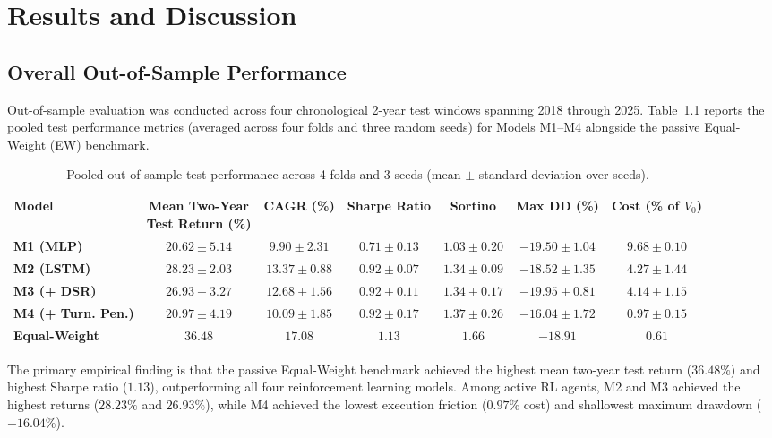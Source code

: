 \chapter{Results and Discussion}
\label{ch:results}

\section{Overall Out-of-Sample Performance}
Out-of-sample evaluation was conducted across four chronological 2-year test windows spanning 2018 through 2025. Table~\ref{tab:overall_results} reports the pooled test performance metrics (averaged across four folds and three random seeds) for Models M1--M4 alongside the passive Equal-Weight (EW) benchmark.

\begin{table}[htbp]
\centering
\small
\setlength{\tabcolsep}{5pt}
\caption{Pooled out-of-sample test performance across 4 folds and 3 seeds (mean $\pm$ standard deviation over seeds).}
\label{tab:overall_results}
\begin{tabular}{lcccccc}
\toprule
\textbf{Model} & \shortstack{\textbf{Mean Two-Year}\\\textbf{Test Return (\%)}} & \textbf{CAGR (\%)} & \textbf{Sharpe Ratio} & \textbf{Sortino} & \textbf{Max DD (\%)} & \textbf{Cost (\% of $V_0$)} \\
\midrule
\textbf{M1 (MLP)} & $20.62 \pm 5.14$ & $9.90 \pm 2.31$ & $0.71 \pm 0.13$ & $1.03 \pm 0.20$ & $-19.50 \pm 1.04$ & $9.68 \pm 0.10$ \\
\textbf{M2 (LSTM)} & $28.23 \pm 2.03$ & $13.37 \pm 0.88$ & $0.92 \pm 0.07$ & $1.34 \pm 0.09$ & $-18.52 \pm 1.35$ & $4.27 \pm 1.44$ \\
\textbf{M3 (+ DSR)} & $26.93 \pm 3.27$ & $12.68 \pm 1.56$ & $0.92 \pm 0.11$ & $1.34 \pm 0.17$ & $-19.95 \pm 0.81$ & $4.14 \pm 1.15$ \\
\textbf{M4 (+ Turn. Pen.)} & $20.97 \pm 4.19$ & $10.09 \pm 1.85$ & $0.92 \pm 0.17$ & $1.37 \pm 0.26$ & $\mathbf{-16.04 \pm 1.72}$ & $\mathbf{0.97 \pm 0.15}$ \\
\midrule
\textbf{Equal-Weight} & $\mathbf{36.48}$ & $\mathbf{17.08}$ & $\mathbf{1.13}$ & $\mathbf{1.66}$ & $-18.91$ & $\mathbf{0.61}$ \\
\bottomrule
\end{tabular}
\end{table}

The primary empirical finding is that the passive Equal-Weight benchmark achieved the highest mean two-year test return ($36.48\%$) and highest Sharpe ratio ($1.13$), outperforming all four reinforcement learning models. Among active RL agents, M2 and M3 achieved the highest returns ($28.23\%$ and $26.93\%$), while M4 achieved the lowest execution friction ($0.97\%$ cost) and shallowest maximum drawdown ($-16.04\%$). 

